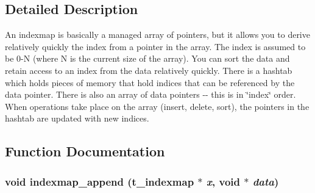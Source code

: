 

\subsection{Detailed Description}
An indexmap is basically a managed array of pointers, but it allows you to derive relatively quickly the index from a pointer in the array. The index is assumed to be 0-\/N (where N is the current size of the array). You can sort the data and retain access to an index from the data relatively quickly. There is a hashtab which holds pieces of memory that hold indices that can be referenced by the data pointer. There is also an array of data pointers -\/-\/ this is in \char`\"{}index\char`\"{} order. When operations take place on the array (insert, delete, sort), the pointers in the hashtab are updated with new indices. 

\subsection{Function Documentation}
\hypertarget{group__indexmap_ga5083e00af855e9b1a20ee5321c8fe3c9}{
\subsubsection[{indexmap\_\-append}]{\setlength{\rightskip}{0pt plus 5cm}void indexmap\_\-append ({\bf t\_\-indexmap} $\ast$ {\em x}, \/  void $\ast$ {\em data})}}
\label{group__indexmap_ga5083e00af855e9b1a20ee5321c8fe3c9}


